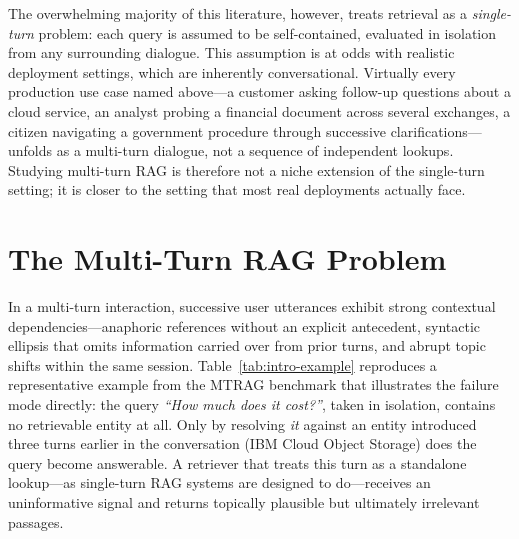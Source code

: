The overwhelming majority of this literature, however, treats retrieval as a \textit{single-turn} problem: each query is assumed to be self-contained, evaluated in isolation from any surrounding dialogue. This assumption is at odds with realistic deployment settings, which are inherently conversational. Virtually every production use case named above---a customer asking follow-up questions about a cloud service, an analyst probing a financial document across several exchanges, a citizen navigating a government procedure through successive clarifications---unfolds as a multi-turn dialogue, not a sequence of independent lookups. Studying multi-turn RAG is therefore not a niche extension of the single-turn setting; it is closer to the setting that most real deployments actually face.

\section{The Multi-Turn RAG Problem}
\label{sec:intro-problem}

In a multi-turn interaction, successive user utterances exhibit strong contextual dependencies---anaphoric references without an explicit antecedent, syntactic ellipsis that omits information carried over from prior turns, and abrupt topic shifts within the same session. Table~\ref{tab:intro-example} reproduces a representative example from the MTRAG benchmark \citep{katsis2025mtrag} that illustrates the failure mode directly: the query \textit{``How much does it cost?''}, taken in isolation, contains no retrievable entity at all. Only by resolving \textit{it} against an entity introduced three turns earlier in the conversation (IBM Cloud Object Storage) does the query become answerable. A retriever that treats this turn as a standalone lookup---as single-turn RAG systems are designed to do---receives an uninformative signal and returns topically plausible but ultimately irrelevant passages.

